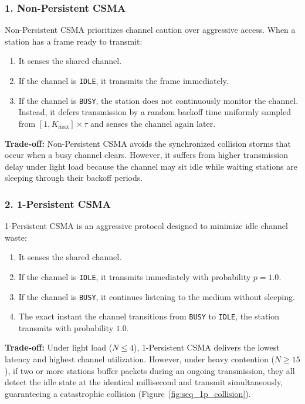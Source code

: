 \documentclass[11pt,a4paper]{article}
\begin{document}
\subsubsection{1. Non-Persistent CSMA}
Non-Persistent CSMA prioritizes channel caution over aggressive access. When a station has a frame ready to transmit:
\begin{enumerate}
    \item It senses the shared channel.
    \item If the channel is \texttt{IDLE}, it transmits the frame immediately.
    \item If the channel is \texttt{BUSY}, the station does not continuously monitor the channel. Instead, it defers transmission by a random backoff time uniformly sampled from $[1, K_{\max}] \times \tau$ and senses the channel again later.
\end{enumerate}
\textbf{Trade-off:} Non-Persistent CSMA avoids the synchronized collision storms that occur when a busy channel clears. However, it suffers from higher transmission delay under light load because the channel may sit idle while waiting stations are sleeping through their backoff periods.

\subsubsection{2. 1-Persistent CSMA}
1-Persistent CSMA is an aggressive protocol designed to minimize idle channel waste:
\begin{enumerate}
    \item It senses the shared channel.
    \item If the channel is \texttt{IDLE}, it transmits immediately with probability $p = 1.0$.
    \item If the channel is \texttt{BUSY}, it continues listening to the medium without sleeping.
    \item The exact instant the channel transitions from \texttt{BUSY} to \texttt{IDLE}, the station transmits with probability $1.0$.
\end{enumerate}
\textbf{Trade-off:} Under light load ($N \le 4$), 1-Persistent CSMA delivers the lowest latency and highest channel utilization. However, under heavy contention ($N \ge 15$), if two or more stations buffer packets during an ongoing transmission, they all detect the idle state at the identical millisecond and transmit simultaneously, guaranteeing a catastrophic collision (Figure~\ref{fig:seq_1p_collision}).
\end{document}
